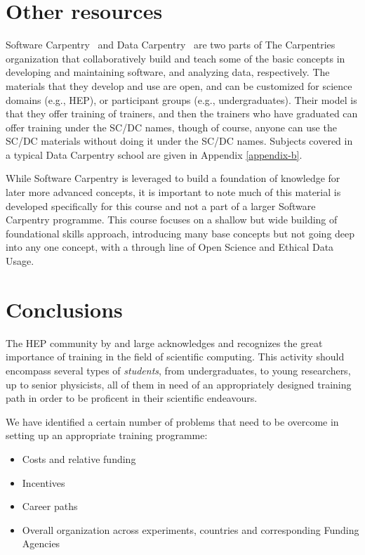 \documentclass[12pt,a4paper]{article}
\begin{document}
\section{Other resources}

Software Carpentry~\cite{SoftwareCarpentry} and Data
Carpentry~\cite{DataCarpentry} are two parts of The
Carpentries organization that collaboratively build and teach some of the basic
concepts in developing and maintaining software, and analyzing data,
respectively.  The materials that they develop and use are open, and can be
customized for science domains (e.g., HEP), or participant groups (e.g.,
undergraduates). Their model is that they offer training of trainers, and then
the trainers who have graduated can offer training under the SC/DC names, though
of course, anyone can use the SC/DC materials without doing it under the SC/DC
names.
Subjects covered in a typical Data Carpentry school are given in Appendix
\ref{appendix-b}.


While Software Carpentry is leveraged to build a foundation of knowledge for
later more advanced concepts, it is important to note much of this material is
developed specifically for this course and not a part of a larger Software
Carpentry programme. This course focuses on a shallow but wide building of
foundational skills approach, introducing many base concepts but not going deep
into any one concept, with a through line of Open Science and Ethical Data
Usage.

\section{Conclusions}

The HEP community by and large acknowledges and recognizes the great importance
of training in the field of scientific computing. This activity should encompass
several types of \emph{students}, from undergraduates, to young researchers,
up to senior physicists, all of them in need of an appropriately designed training
path in order to be proficent in their scientific endeavours.

We have identified a certain number of problems that need to be overcome in
setting up an appropriate training programme:
\begin{itemize}
    \item Costs and relative funding
    \item Incentives
    \item Career paths
    \item Overall organization across experiments, countries and
    corresponding Funding Agencies
\end{itemize}
\end{document}
